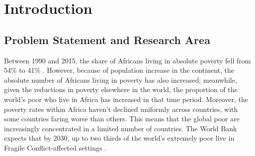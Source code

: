 \chapter{Introduction}





\section{Problem Statement and Research Area}




Between 1990 and 2015, the share of Africans living in absolute poverty fell from 54\% to 41\% \citep{Beegle2019}. However, because of population increase in the continent, the absolute number of Africans living in poverty has also increased; meanwhile, given the reductions in poverty elsewhere in the world, the proportion of the world's poor who live in Africa has increased in that time period.  Moreover, the poverty rates within Africa haven't declined uniformly across countries, with some countries faring worse than others. This means that the global poor are increasingly concentrated in a limited number of countries. The World Bank expects that by 2030, up to two thirds of the world's extremely poor live in Fragile Conflict-affected settings \citep{WorldBank2019}. %

